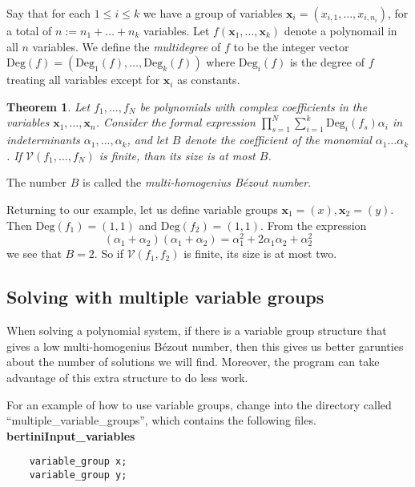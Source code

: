 \documentclass[12pt]{article}
\newtheorem{theorem}{Theorem}[section]
\theoremstyle{definition}
\newcommand{\Deg}{\text{Deg}}
\begin{document}
Say that for each $1 \leq i \leq k$ we have a group of variables 
$\mathbf{x}_i = (x_{i,1}, \ldots, x_{i,n_i})$, for a total of $n := n_1 
+ \ldots + n_k$ variables. Let $f(\mathbf{x}_1, \ldots, 
\mathbf{x}_k)$ denote a polynomail in all $n$ variables. We define the 
\emph{multidegree} of $f$ to be the integer vector $\Deg(f) = 
(\Deg_1(f), \ldots, \Deg_k(f))$ where $\Deg_i(f)$ is the degree of $f$ 
treating all variables except for $\mathbf{x}_i$ as constants.

\begin{theorem}
Let $f_1, \ldots, f_N$ be polynomials with complex coefficients in the 
   variables $\mathbf{x}_1, 
\ldots, \mathbf{x}_n$. Consider the formal expression $\prod_{s = 1}^N 
\sum_{i = 1}^{k} \Deg_i(f_s) \alpha_i$ in indeterminants $\alpha_1, 
\ldots, \alpha_k$, and let $B$ denote the coefficient of the monomial 
$\alpha_1\ldots \alpha_k$. If $\mathcal{V}(f_1, \ldots, f_N)$ is finite, 
than its size is at most $B$.
\end{theorem}

The number $B$ is called the \emph{multi-homogenius B\'{e}zout number}.

Returning to our example, let us define variable groups $\mathbf{x}_1 = 
(x), \mathbf{x}_2 = (y)$. Then $\Deg(f_1) = (1,1)$ and $\Deg(f_2) = 
(1,1)$. From the expression
\[
    (\alpha_1 + \alpha_2)(\alpha_1 + \alpha_2) = \alpha_1^2 + 
   2\alpha_1\alpha_2 + \alpha_2^2
\]
we see that $B = 2$. So if $\mathcal{V}(f_1, f_2)$ is finite, its size is 
at most two.

\subsection{Solving with multiple variable groups}
When solving a polynomial system, if there is a variable group structure 
that gives a low multi-homogenius B\'{e}zout number, then this 
gives us better garunties about the number of solutions we will find. 
Moreover, the program can take advantage of this extra structure to do 
less work.

For an example of how to use variable groups, change into the directory 
called ``multiple\_variable\_groups'', which contains the following 
files.\\

\noindent \textbf{bertiniInput\_variables}
\begin{leftbar}
\vspace{-10pt} 
\begin{verbatim}
    variable_group x; 
    variable_group y; 
\end{verbatim}\vspace{-10pt} 
\end{leftbar}
\end{document}
